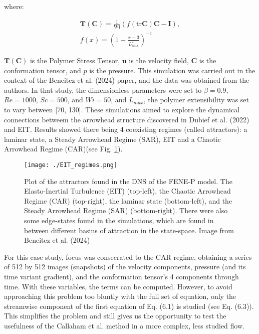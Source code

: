 \documentclass[12pt]{report} %
\begin{document}
where:

\begin{equation}
  \begin{aligned}
    \mathbf{T}(\mathbf{C}) = \frac{1}{\text{Wi}} \left(f(\text{tr}\mathbf{C})\mathbf{C} - \mathbf{I}\right), \\
    f(x) = \left(1 - \frac{x - 3}{L_{\text{max}}^2}\right)^{-1}
  \end{aligned}
\end{equation}

$\mathbf{T}(\mathbf{C})$ is the Polymer Stress Tensor, $\mathbf{u}$ is the velocity field, $\mathbf{C}$ is the conformation tensor, and $p$ is the pressure. This simulation was carried out in the context of the Beneitez et al. (2024) paper\cite{beneitez2024multistability}, and the data was obtained from the authors. In that study, the dimensionless parameters were set to $\beta = 0.9$, $Re = 1000$, $Sc = 500$, and $Wi = 50$, and $L_{max}$, the polymer extensibility was set to vary between [70, 130]. These simulations aimed to explore the dynamical connections betweem the arrowhead structure discovered in Dubief et al. (2022)\cite{dubief2022first} and EIT. Results showed there being 4 coexisting regimes (called attractors): a laminar state, a Steady Arrowhead Regime (SAR), EIT and a Chaotic Arrowhead Regime (CAR)(see Fig. \ref{fig:attractors}).

\begin{figure}
  \centering
  \texttt{[image: ./EIT\_regimes.png]}
  \caption{Plot of the attractors found in the DNS of the FENE-P model. The Elasto-Inertial Turbulence (EIT) (top-left), the Chaotic Arrowhead Regime (CAR) (top-right), the laminar state (bottom-left), and the Steady Arrowhead Regime (SAR) (bottom-right). There were also some edge-states found in the simulations, which are found in between different basins of attraction in the state-space. Image from Beneitez et al. (2024)\cite{beneitez2024multistability}}
  \label{fig:attractors}
\end{figure}

For this case study, focus was consecrated to the CAR regime, obtaining a series of 512 by 512 images (snapshots) of the velocity components, pressure (and its time variant gradient), and the conformation tensor's 4 components through time. With these variables, the terms can be computed. However, to avoid approaching this problem too bluntly with the full set of equation, only the streamwise component of the first equation of Eq. (6.1) is studied (see Eq. (6.3)). This simplifies the problem and still gives us the opportunity to test the usefulness of the Callaham et al. method in a more complex, less studied flow.
\end{document}
